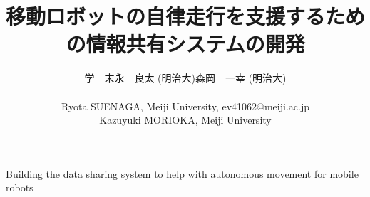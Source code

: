 \documentclass[9pt]{jarticle}
\begin{document}
\makeatletter
\title{移動ロボットの自律走行を支援するための情報共有システムの開発}
{}
{Building the data sharing system to help with autonomous movement for mobile robots}
{}


\author{
\begin{tabular}{ll}
 \hspace{1zw}学\hspace{1zw}　末永　良太 (明治大)\hspace{1zw}森岡　一幸 (明治大)\\
 &\\
 \multicolumn{2}{l}{\small Ryota SUENAGA, Meiji University, ev41062@meiji.ac.jp}\\
 \multicolumn{2}{l}{\small Kazuyuki MORIOKA, Meiji University}\\
\end{tabular}
}
\makeatother

\abstract{ \small 

}

\date{} %

\maketitle
\thispagestyle{empty}
\pagestyle{empty}

\small

\begin{spacing}{1.2}




\end{spacing}

\footnotesize
\begin{thebibliography}{99}


\end{thebibliography}

\normalsize
\end{document}
